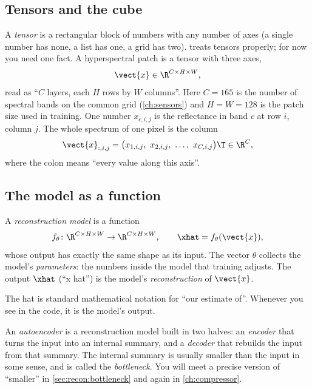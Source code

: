 \subsection{Tensors and the cube}

A \emph{tensor} is a rectangular block of numbers with any number of axes (a single
number has none, a list has one, a grid has two).  treats tensors properly; for now
you need one fact. A hyperspectral patch is a tensor with three axes,
\begin{equation}
\vect{x} \in \R^{C\times H\times W},
\end{equation}
read as ``$C$ layers, each $H$ rows by $W$ columns''. Here $C=165$ is the number of spectral bands on
the common grid (\cref{ch:sensors}) and $H=W=128$ is the patch size used in training. One number
$x_{c,i,j}$ is the reflectance in band $c$ at row $i$, column $j$. The whole spectrum of one pixel is
the column
\begin{equation}
\vect{x}_{:,i,j} = \bigl(x_{1,i,j},\ x_{2,i,j},\ \dots,\ x_{C,i,j}\bigr)\T \in \R^{C},
\end{equation}
where the colon means ``every value along this axis''.

\subsection{The model as a function}

\begin{definition}\label{def:recon:model}
A \emph{reconstruction model} is a function
\begin{equation}\label{eq:recon:f}
f_{\theta}\colon \R^{C\times H\times W} \to \R^{C\times H\times W},\qquad
\xhat = f_{\theta}(\vect{x}),
\end{equation}
whose output has exactly the same shape as its input. The vector $\theta$ collects the model's
\emph{parameters}: the numbers inside the model that training adjusts. The output
$\xhat$ (``x hat'') is the model's \emph{reconstruction} of $\vect{x}$.
\end{definition}

The hat is standard mathematical notation for ``our estimate of''. Whenever you see  in the
code, it is the model's output.

An \emph{autoencoder} is a reconstruction model built in two halves: an
\emph{encoder} that turns the input into an internal summary, and a
\emph{decoder} that rebuilds the input from that summary. The internal summary is
usually smaller than the input in some sense, and is called the \emph{bottleneck}.
You will meet a precise version of ``smaller'' in \cref{sec:recon:bottleneck} and again in
\cref{ch:compressor}.

